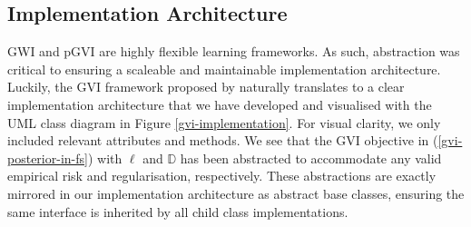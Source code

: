 \documentclass{article}
\numberwithin{equation}{section}
\begin{document}
\subsection{Implementation Architecture}\label{implementation-architecture}
GWI and pGVI are highly flexible learning frameworks. As such, abstraction was critical to ensuring a scaleable and maintainable implementation architecture.
Luckily, the GVI framework proposed by \cite{knoblauch2022optimization} naturally translates to a clear implementation architecture that we have developed and visualised with the UML class diagram in Figure \ref{gvi-implementation}.
For visual clarity, we only included relevant attributes and methods.
We see that the GVI objective in (\ref{gvi-posterior-in-fs}) with $\ell$ and $\mathbb{D}$ has been abstracted to accommodate any valid empirical risk and regularisation, respectively.
These abstractions are exactly mirrored in our implementation architecture as abstract base classes, ensuring the same interface is inherited by all child class implementations.
\end{document}
